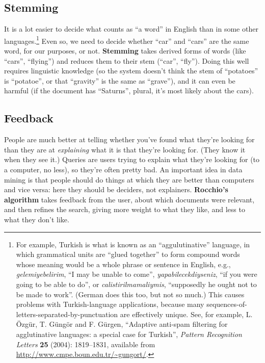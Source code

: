 \documentclass{article}
\begin{document}
\subsection{Stemming}

It is a lot easier to decide what counts as ``a word'' in English than in some
other languages.\footnote{For example, Turkish is what is known as an
  ``aggulutinative'' language, in which grammatical units are ``glued
  together'' to form compound words whose meaning would be a whole phrase or
  sentence in English, e.g., {\em gelemiyebelirim}, ``I may be unable to
  come'', {\em yapabilecekdiyseniz}, ``if you were going to be able to do'', or
  {\em calistirilmamaliymis}, ``supposedly he ought not to be made to work''.
  (German does this too, but not so much.)  This causes problems with
  Turkish-language applications, because many
  sequences-of-letters-separated-by-punctuation are effectively unique.  See,
  for example, L. {\"O}zg{\"u}r, T. G{\"u}ng{\"o}r and F. G{\"u}rgen,
  ``Adaptive anti-spam filtering for agglutinative languages: a special case
  for Turkish'', {\em Pattern Recognition Letters} {\bf 25} (2004): 1819--1831,
  available from \url{http://www.cmpe.boun.edu.tr/~gungort/}.}  Even so, we
need to decide whether ``car'' and ``cars'' are the same word, for our
purposes, or not.  {\bf Stemming} takes derived forms of words (like ``cars'',
``flying'') and reduces them to their stem (``car'', ``fly'').  Doing this well
requires linguistic knowledge (so the system doesn't think the stem of
``potatoes'' is ``potatoe'', or that ``gravity'' is the same as ``grave''), and
it can even be harmful (if the document has ``Saturns'', plural, it's most
likely about the cars).

\subsection{Feedback}

People are much better at telling whether you've found what they're looking for
than they are at {\em explaining} what it is that they're looking for.  (They
know it when they see it.)  Queries are users trying to explain what they're
looking for (to a computer, no less), so they're often pretty bad.  An
important idea in data mining is that people should do things at which they are
better than computers and vice versa: here they should be deciders, not
explainers.  {\bf Rocchio's algorithm} takes feedback from the user, about
which documents were relevant, and then refines the search, giving more weight
to what they like, and less to what they don't like.
\end{document}
